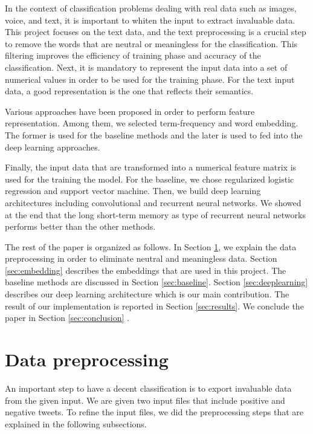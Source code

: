 \documentclass[8pt,conference,compsocconf]{IEEEtran}
\begin{document}
In the context of classification problems dealing with real data such as images, voice, and text, it is important to whiten the input to extract invaluable data. This project focuses on the text data, and the text preprocessing is a crucial step to remove the words that are neutral or meaningless for the classification. This filtering improves the efficiency of training phase and accuracy of the classification. Next, it is mandatory to represent the  input data into a set of numerical values in order to be used for the training phase. For the text input data, a good representation is the one that reflects their semantics. 

Various approaches have been proposed in order to perform feature representation. Among them, we selected term-frequency and word embedding. The former is used for the baseline methods and the later is used to fed into the deep learning approaches.

Finally, the input data that are transformed into a numerical feature matrix is used for the training the model. For the baseline, we chose regularized logistic regression and support vector machine. Then, we build deep learning architectures including convolutional and recurrent neural networks. We showed at the end that the long short-term memory as type of recurrent neural networks performs better than the other methods.

The rest of the paper is organized as follows. In Section \ref{sec:data}, we explain the data preprocessing in order to eliminate neutral and meaningless data. Section \ref{sec:embedding} describes the embeddings that are used in this project. The baseline methods are discussed in Section \ref{sec:baseline}. Section \ref{sec:deeplearning} describes our deep learning architecture which is our main contribution. The result of our implementation is reported in Section \ref{sec:results}. We conclude the paper in Section \ref{sec:conclusion}
.

\section{Data preprocessing}\label{sec:data}
An important step to have a decent classification is to export invaluable data from the given input. We are given two input files that include positive and negative tweets. To refine the input files, we did the preprocessing steps that are explained in the following subsections.
\end{document}
